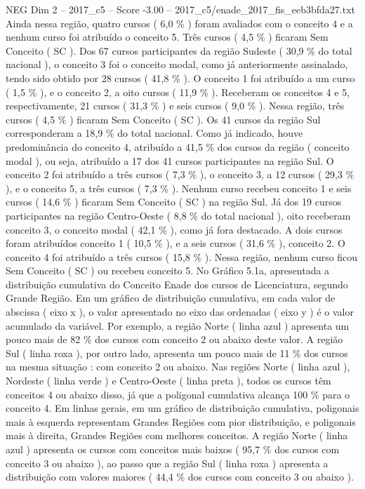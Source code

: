 \begin{textsample}{NEG Dim 2 – 2017\_c5 – Score -3.00 – 2017\_c5/enade\_2017\_fis\_eeb3bfda27.txt}
Ainda nessa região, quatro cursos ( 6,0 \% ) foram avaliados com o conceito 4 e a nenhum curso foi atribuído o conceito 5.
Três cursos ( 4,5 \% ) ficaram Sem Conceito ( SC ).
Dos 67 cursos participantes da região Sudeste ( 30,9 \% do total nacional ), o conceito 3 foi o conceito modal, como já anteriormente assinalado, tendo sido obtido por 28 cursos ( 41,8 \% ).
O conceito 1 foi atribuído a um curso ( 1,5 \% ), e o conceito 2, a oito cursos ( 11,9 \% ).
Receberam os conceitos 4 e 5, respectivamente, 21 cursos ( 31,3 \% ) e seis cursos ( 9,0 \% ).
Nessa região, três cursos ( 4,5 \% ) ficaram Sem Conceito ( SC ).
Os 41 cursos da região Sul corresponderam a 18,9 \% do total nacional.
Como já indicado, houve predominância do conceito 4, atribuído a 41,5 \% dos cursos da região ( conceito modal ), ou seja, atribuído a 17 dos 41 cursos participantes na região Sul.
O conceito 2 foi atribuído a três cursos ( 7,3 \% ), o conceito 3, a 12 cursos ( 29,3 \% ), e o conceito 5, a três cursos ( 7,3 \% ).
Nenhum curso recebeu conceito 1 e seis cursos ( 14,6 \% ) ficaram Sem Conceito ( SC ) na região Sul.
Já dos 19 cursos participantes na região Centro-Oeste ( 8,8 \% do total nacional ), oito receberam conceito 3, o conceito modal ( 42,1 \% ), como já fora destacado.
A dois cursos foram atribuídos conceito 1 ( 10,5 \% ), e a seis cursos ( 31,6 \% ), conceito 2.
O conceito 4 foi atribuído a três cursos ( 15,8 \% ).
Nessa região, nenhum curso ficou Sem Conceito ( SC ) ou recebeu conceito 5.
No Gráfico 5.1a, apresentada a distribuição cumulativa do Conceito Enade dos cursos de Licenciatura, segundo Grande Região.
Em um gráfico de distribuição cumulativa, em cada valor de abscissa ( eixo x ), o valor apresentado no eixo das ordenadas ( eixo y ) é o valor acumulado da variável.
Por exemplo, a região Norte ( linha azul ) apresenta um pouco mais de 82 \% dos cursos com conceito 2 ou abaixo deste valor.
A região Sul ( linha roxa ), por outro lado, apresenta um pouco mais de 11 \% dos cursos na mesma situação : com conceito 2 ou abaixo.
Nas regiões Norte ( linha azul ), Nordeste ( linha verde ) e Centro-Oeste ( linha preta ), todos os cursos têm conceitos 4 ou abaixo disso, já que a poligonal cumulativa alcança 100 \% para o conceito 4.
Em linhas gerais, em um gráfico de distribuição cumulativa, poligonais mais à esquerda representam Grandes Regiões com pior distribuição, e poligonais mais à direita, Grandes Regiões com melhores conceitos.
A região Norte ( linha azul ) apresenta os cursos com conceitos mais baixos ( 95,7 \% dos cursos com conceito 3 ou abaixo ), ao passo que a região Sul ( linha roxa ) apresenta a distribuição com valores maiores ( 44,4 \% dos cursos com conceito 3 ou abaixo ).

\end{textsample}
